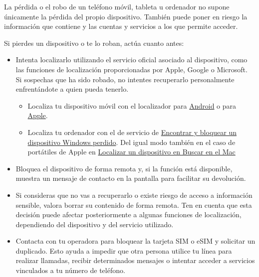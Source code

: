 \documentclass[
  spanish,
  a4paper,
  openany]{book}
\begin{document}
La pérdida o el robo de un teléfono móvil, tableta u ordenador no supone únicamente la pérdida del propio dispositivo. También puede poner en riesgo la información que contiene y las cuentas y servicios a los que permite acceder.

Si pierdes un dispositivo o te lo roban, actúa cuanto antes:

\begin{itemize}
\item
  Intenta localizarlo utilizando el servicio oficial asociado al dispositivo, como las funciones de localización proporcionadas por Apple, Google o Microsoft. Si sospechas que ha sido robado, no intentes recuperarlo personalmente enfrentándote a quien pueda tenerlo.

  \begin{itemize}
  \item
    Localiza tu dispositivo móvil con el localizador para \href{https://myaccount.google.com/intro/find-your-phone?hl=es-ES}{Android} o para \href{https://www.apple.com/es/icloud/find-my/}{Apple}.
  \item
    Localiza tu ordenador con el de servicio de \href{https://support.microsoft.com/es-es/account-billing/encontrar-y-bloquear-un-dispositivo-windows-perdido-890bf25e-b8ba-d3fe-8253-e98a12f26316\#:~:text=Activa\%20Encontrar\%20mi\%20dispositivo&text=Windows\%2011\%3A\%20selecciona\%20InicioConfiguraci\%C3\%B3n,privacidad\%20\%26\%20\%3E\%20Encuentra\%20mi\%20dispositivo.}{Encontrar y bloquear un dispositivo Windows perdido}. Del igual modo también en el caso de portátiles de Apple en \href{https://support.apple.com/es-es/guide/findmy-mac/fmmc6c7ef383/mac}{Localizar un dispositivo en Buscar en el Mac}
  \end{itemize}
\item
  Bloquea el dispositivo de forma remota y, si la función está disponible, muestra un mensaje de contacto en la pantalla para facilitar su devolución.
\item
  Si consideras que no vas a recuperarlo o existe riesgo de acceso a información sensible, valora borrar su contenido de forma remota. Ten en cuenta que esta decisión puede afectar posteriormente a algunas funciones de localización, dependiendo del dispositivo y del servicio utilizado.
\item
  Contacta con tu operadora para bloquear la tarjeta SIM o eSIM y solicitar un duplicado. Esto ayuda a impedir que otra persona utilice tu línea para realizar llamadas, recibir determinados mensajes o intentar acceder a servicios vinculados a tu número de teléfono.

\end{itemize}
\end{document}
